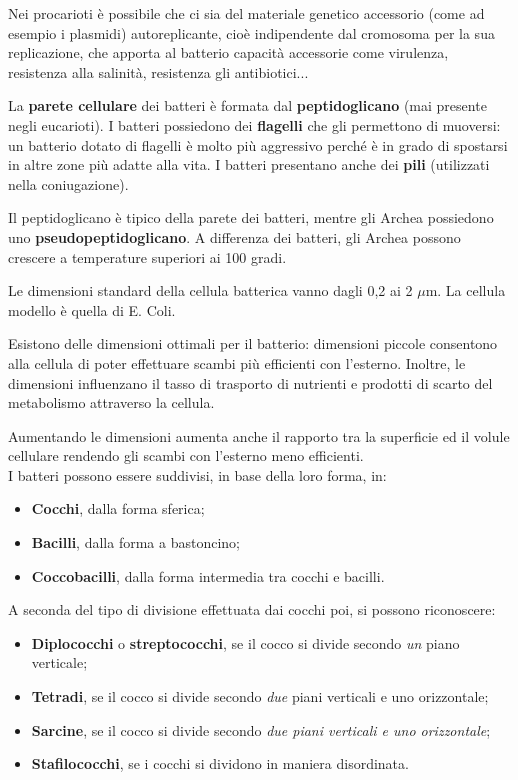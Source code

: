 \documentclass[11pt]{book}
\begin{document}
Nei procarioti è possibile che ci sia del materiale genetico accessorio (come ad esempio i plasmidi) autoreplicante, cioè indipendente dal cromosoma per la sua replicazione, che apporta al batterio capacità accessorie come virulenza, resistenza alla salinità, resistenza gli antibiotici...

La \textbf{parete cellulare} dei batteri è formata dal \textbf{peptidoglicano} (mai presente negli eucarioti).
I batteri possiedono dei \textbf{flagelli} che gli permettono di muoversi: un batterio dotato di flagelli è molto più aggressivo perché è in grado di spostarsi in altre zone più adatte alla vita.
I batteri presentano anche dei \textbf{pili} (utilizzati nella coniugazione).

Il peptidoglicano è tipico della parete dei batteri, mentre gli Archea possiedono uno \textbf{pseudopeptidoglicano}.
A differenza dei batteri, gli Archea possono crescere a temperature superiori ai 100 gradi.

\vspace{1em}
Le dimensioni standard della cellula batterica vanno dagli 0,2 ai 2 $\mu$m.
La cellula modello è quella di E. Coli.

Esistono delle dimensioni ottimali per il batterio: dimensioni piccole consentono alla cellula di poter effettuare scambi più efficienti con l'esterno. Inoltre, le dimensioni influenzano il tasso di trasporto di nutrienti e prodotti di scarto del metabolismo attraverso la cellula.

Aumentando le dimensioni aumenta anche il rapporto tra la superficie ed il volule cellulare rendendo gli scambi con l'esterno meno efficienti.\\

I batteri possono essere suddivisi, in base della loro forma, in:
\begin{itemize}
\item \textbf{Cocchi}, dalla forma sferica;
\item \textbf{Bacilli}, dalla forma a bastoncino;
\item \textbf{Coccobacilli}, dalla forma intermedia tra cocchi e bacilli.
\end{itemize}

A seconda del tipo di divisione effettuata dai cocchi poi, si possono riconoscere:
\begin{itemize}
\item \textbf{Diplococchi} o \textbf{streptococchi}, se il cocco si divide secondo \emph{un} piano verticale;
\item \textbf{Tetradi}, se il cocco si divide secondo \emph{due} piani verticali e uno orizzontale;
\item \textbf{Sarcine}, se il cocco si divide secondo \emph{due piani verticali e uno orizzontale};
\item \textbf{Stafilococchi}, se i cocchi si dividono in maniera disordinata.
\end{itemize}
\end{document}
